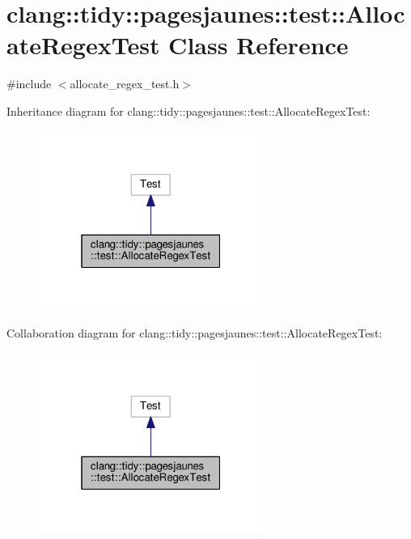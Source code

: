 \hypertarget{classclang_1_1tidy_1_1pagesjaunes_1_1test_1_1_allocate_regex_test}{}\section{clang\+:\+:tidy\+:\+:pagesjaunes\+:\+:test\+:\+:Allocate\+Regex\+Test Class Reference}
\label{classclang_1_1tidy_1_1pagesjaunes_1_1test_1_1_allocate_regex_test}


{\ttfamily \#include $<$allocate\+\_\+regex\+\_\+test.\+h$>$}



Inheritance diagram for clang\+:\+:tidy\+:\+:pagesjaunes\+:\+:test\+:\+:Allocate\+Regex\+Test\+:
\nopagebreak
\begin{figure}[H]
\begin{center}
\leavevmode
\includegraphics[width=208pt]{classclang_1_1tidy_1_1pagesjaunes_1_1test_1_1_allocate_regex_test__inherit__graph}
\end{center}
\end{figure}


Collaboration diagram for clang\+:\+:tidy\+:\+:pagesjaunes\+:\+:test\+:\+:Allocate\+Regex\+Test\+:
\nopagebreak
\begin{figure}[H]
\begin{center}
\leavevmode
\includegraphics[width=208pt]{classclang_1_1tidy_1_1pagesjaunes_1_1test_1_1_allocate_regex_test__coll__graph}
\end{center}
\end{figure}
